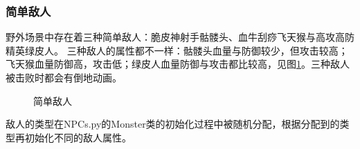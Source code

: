 \documentclass{ctexart}
\begin{document}
\subsubsection{简单敌人}
野外场景中存在着三种简单敌人：脆皮神射手骷髅头、血牛刮痧飞天猴与高攻高防精英绿皮人。
三种敌人的属性都不一样：骷髅头血量与防御较少，但攻击较高；飞天猴血量防御高，攻击低；绿皮人血量防御与攻击都比较高，见图\ref{fig:简单敌人}。三种敌人被击败时都会有倒地动画。
\begin{figure}[h]
\centering
{}
\caption{\label{fig:简单敌人}简单敌人}
\end{figure}

敌人的类型在NPCs.py的Monster类的初始化过程中被随机分配，根据分配到的类型再初始化不同的敌人属性。
\end{document}
